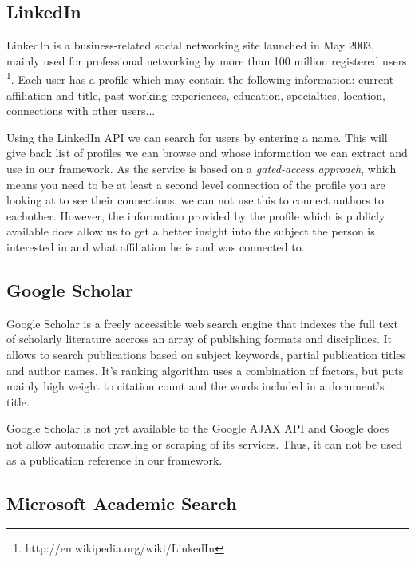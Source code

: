 
\subsection{LinkedIn}

LinkedIn is a business-related social networking site launched in May 2003, mainly used for professional networking by more than 100 million registered users \footnote{http://en.wikipedia.org/wiki/LinkedIn}. Each user has a profile which may contain the following information: current affiliation and title, past working experiences, education, specialties, location, connections with other users...

Using the LinkedIn API we can search for users by entering a name. This will give back list of profiles we can browse and whose information we can extract and use in our framework. As the service is based on a \textit{gated-access approach}, which means you need to be at least a second level connection of the profile you are looking at to see their connections, we can not use this to connect authors to eachother. However, the information provided by the profile which is publicly available does allow us to get a better insight into the subject the person is interested in and what affiliation he is and was connected to.


\subsection{Google Scholar}

Google Scholar is a freely accessible web search engine that indexes the full text of scholarly literature accross an array of publishing formats and disciplines. It allows to search publications based on subject keywords, partial publication titles and author names. It's ranking algorithm uses a combination of factors, but puts mainly high weight to citation count and the words included in a document's title.

Google Scholar is not yet available to the Google AJAX API and Google does not allow automatic crawling or scraping of its services. Thus, it can not be used as a publication reference in our framework.

\subsection{Microsoft Academic Search}

